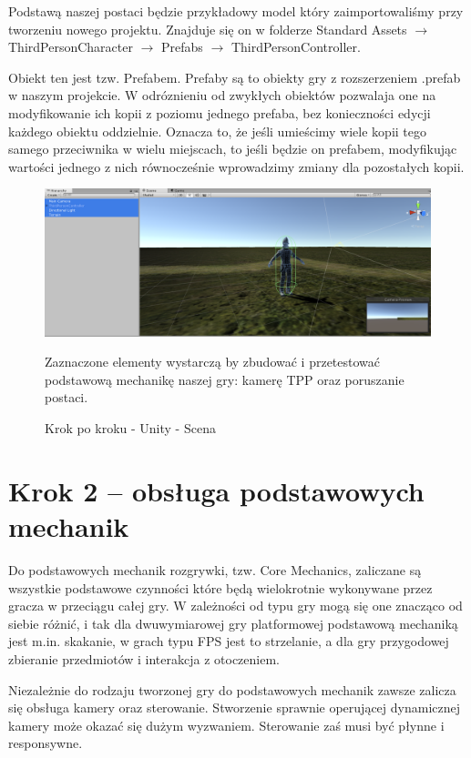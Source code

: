 \documentclass[12pt]{xmgr}
\begin{document}
Podstawą naszej postaci będzie przykładowy model który zaimportowaliśmy przy tworzeniu nowego projektu. Znajduje się on w folderze Standard Assets $\rightarrow$ ThirdPersonCharacter $\rightarrow$ Prefabs $\rightarrow$ ThirdPersonController.

Obiekt ten jest tzw. Prefabem. Prefaby są to obiekty gry z rozszerzeniem .prefab w naszym projekcie. W odróznieniu od zwykłych obiektów pozwalaja one na modyfikowanie ich kopii  z poziomu jednego prefaba, bez konieczności edycji każdego obiektu oddzielnie. Oznacza to, że jeśli umieścimy wiele kopii tego samego przeciwnika w wielu miejscach, to jeśli będzie on prefabem, modyfikując wartości jednego z nich równocześnie wprowadzimy zmiany dla pozostałych kopii.

\begin{figure}[!htb]
    \begin{center}
    \includegraphics[scale=0.25]{Screeny/UnityKrokPoKroku/krok1_endscreen.png}
    \end{center}
    \caption{Krok po kroku - Unity - Scena}
Zaznaczone elementy wystarczą by zbudować i przetestować podstawową mechanikę naszej gry: kamerę TPP oraz poruszanie postaci.
\end{figure}

\section{Krok 2 – obsługa podstawowych mechanik}

Do podstawowych mechanik rozgrywki, tzw. Core  Mechanics, zaliczane są wszystkie podstawowe czynności które będą wielokrotnie wykonywane przez gracza w przeciągu całej gry. W zależności od typu gry mogą się one znacząco od siebie różnić, i tak dla dwuwymiarowej gry platformowej podstawową mechaniką jest m.in. skakanie, w grach typu FPS jest to strzelanie, a dla gry przygodowej zbieranie przedmiotów i interakcja z otoczeniem.

Niezależnie do rodzaju tworzonej gry do podstawowych mechanik zawsze zalicza się obsługa kamery oraz sterowanie. Stworzenie sprawnie operującej dynamicznej kamery może okazać się dużym wyzwaniem. Sterowanie zaś musi być płynne i responsywne.
\end{document}
